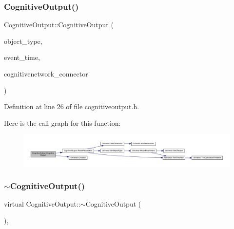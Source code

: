 \subsubsection{\texorpdfstring{Cognitive\+Output()}{CognitiveOutput()}\hspace{0.1cm}{\footnotesize\ttfamily [4/4]}}
{\footnotesize\ttfamily Cognitive\+Output\+::\+Cognitive\+Output (\begin{DoxyParamCaption}\item[{unsigned int}]{object\+\_\+type,  }\item[{std\+::chrono\+::time\+\_\+point$<$ \mbox{\hyperlink{universe_8h_a0ef8d951d1ca5ab3cfaf7ab4c7a6fd80}{Clock}} $>$}]{event\+\_\+time,  }\item[{\mbox{\hyperlink{class_cognitive_network}{Cognitive\+Network}} \&}]{cognitivenetwork\+\_\+connector }\end{DoxyParamCaption})\hspace{0.3cm}{\ttfamily [inline]}}



Definition at line 26 of file cognitiveoutput.\+h.

Here is the call graph for this function\+:\nopagebreak
\begin{figure}[H]
\begin{center}
\leavevmode
\includegraphics[width=350pt]{class_cognitive_output_a9874901c7b49a6bb495d34c84fdbf651_cgraph}
\end{center}
\end{figure}
\mbox{\label{class_cognitive_output_aefe310a8577684210d82236033791036}} 
\subsubsection{\texorpdfstring{$\sim$\+Cognitive\+Output()}{~CognitiveOutput()}}
{\footnotesize\ttfamily virtual Cognitive\+Output\+::$\sim$\+Cognitive\+Output (\begin{DoxyParamCaption}{ }\end{DoxyParamCaption})\hspace{0.3cm}{\ttfamily [inline]}, {\ttfamily [virtual]}}

